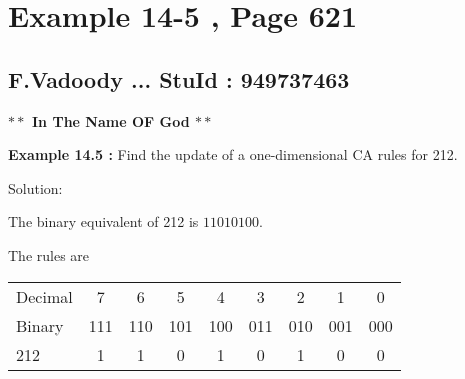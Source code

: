 \documentclass [7pt]{beamer}
\begin{document}
	\small
	\section*{Example 14-5 , Page 621 }
	\subsection*{F.Vadoody ... StuId : 949737463 }
	\begin{frame}
		
		\begin{center}
			
			{\large{\textbf{$**$ In The Name OF God  $**$}}}\vspace*{1cm}
						
		\end{center}
	
			
		\textbf{Example 14.5 :} Find the update of a one-dimensional CA rules for 212.
		\vspace*{0.1cm}
		
		
		Solution:\\
		\vspace*{0.1cm}
		
		
		The binary equivalent of 212 is $11010100 .$
		\vspace*{0.1cm}
		
		
		The rules are 
		\vspace*{0.1cm}
		
			
		\begin{center}
			\begin{tabular}{lcccccccc}
				\hline\vspace*{0.1cm}
				 Decimal & 7 & 6 & 5 & 4 & 3 & 2 & 1 & 0 \\
				Binary & 111 & 110 & 101 & 100 & 011 & 010 & 001 & 000 \\
				212 & 1 & 1 & 0 & 1 & 0 & 1 & 0 & 0 \\
				\hline
			\end{tabular}
		\end{center}
	
	
	\end{frame}
\end{document}
